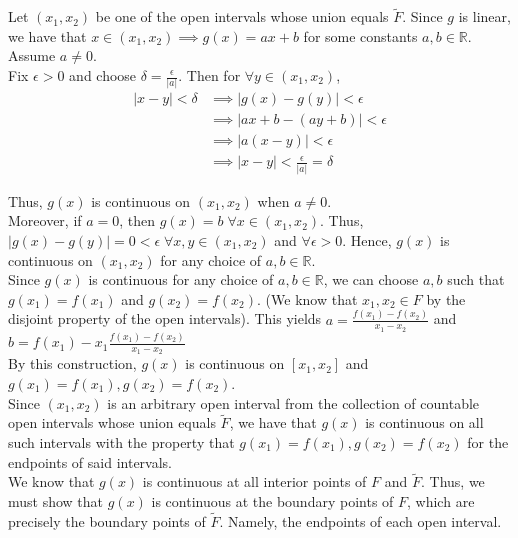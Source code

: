 \documentclass[12pt]{article}
\begin{document}
Let $(x_1, x_2)$ be one of the open intervals whose union equals $\tilde{F}$. Since $g$ is linear, we have that $x \in (x_1, x_2) \implies g(x) = ax + b$ for some constants $a, b \in \mathbb{R}$. Assume $a \neq 0$.\\

Fix $\epsilon > 0$ and choose $\delta = \frac{\epsilon}{|a|}$. Then for  $\forall y \in (x_1, x_2)$,
\begin{align*}
|x - y| < \delta &\implies |g(x) - g(y)| < \epsilon\\
&\implies |ax + b - (ay + b)| < \epsilon\\
&\implies |a(x - y)| < \epsilon\\
&\implies |x - y| < \frac{\epsilon}{|a|} = \delta
\end{align*}

Thus, $g(x)$ is continuous on $(x_1, x_2)$ when $a \neq 0$.\\

Moreover, if $a = 0$, then $g(x) = b \; \forall x \in (x_1, x_2)$. Thus, $|g(x) - g(y)| = 0 < \epsilon \; \forall x, y \in (x_1, x_2)$ and $\forall \epsilon > 0$. Hence, $g(x)$ is continuous on $(x_1, x_2)$ for any choice of $a, b \in \mathbb{R}$.\\

Since $g(x)$ is continuous for any choice of $a, b \in \mathbb{R}$, we can choose $a, b$ such that $g(x_1) = f(x_1)$ and $g(x_2) = f(x_2)$. (We know that $x_1, x_2 \in F$ by the disjoint property of the open intervals). This yields $a = \frac{f(x_1) - f(x_2)}{x_1 - x_2}$ and $b = f(x_1) - x_1\frac{f(x_1) - f(x_2)}{x_1 - x_2}$\\

By this construction, $g(x)$ is continuous on $[x_1, x_2]$ and $g(x_1) = f(x_1), g(x_2) = f(x_2)$.\\

Since $(x_1, x_2)$ is an arbitrary open interval from the collection of countable open intervals whose union equals $\tilde{F}$, we have that $g(x)$ is continuous on all such intervals with the property that $g(x_1) = f(x_1), g(x_2) = f(x_2)$ for the endpoints of said intervals.\\

We know that $g(x)$ is continuous at all interior points of $F$ and $\tilde{F}$. Thus, we must show that $g(x)$ is continuous at the boundary points of $F$, which are precisely the boundary points of $\tilde{F}$. Namely, the endpoints of each open interval.\\
\end{document}
